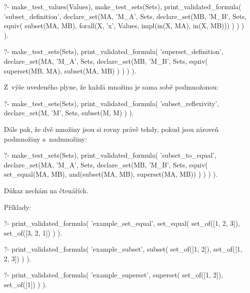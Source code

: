 \begin{prolog}
?- 	make_test_values(Values),
	make_test_sets(Sets),
	print_validated_formula(
		'subset_definition',
		declare_set(MA, 'M_A', Sets,
			declare_set(MB, 'M_B', Sets,
				equiv(
					subset(MA, MB),
					forall(X, 'x', Values, impl(in(X, MA), in(X, MB)))
				)
			)
		)
	).
\end{prolog}

\begin{prolog}
?-	make_test_sets(Sets),
	print_validated_formula(
		'superset_definition',
		declare_set(MA, 'M_A', Sets,
			declare_set(MB, 'M_B', Sets,
				equiv(
					superset(MB, MA),
					subset(MA, MB)
				)
			)
		)
	).
\end{prolog}

Z~výše uvedeného plyne, že každá množina je sama sobě podmnožonou:

\begin{prolog}
?-	make_test_sets(Sets),
	print_validated_formula(
		'subset_reflexivity',
		declare_set(M, 'M', Sets,
			subset(M, M)
		)
	).
\end{prolog}

Dále pak, že dvě množiny jsou si rovny právě tehdy, pokud jsou zároveň podmnožiny a~nadmnožiny:

\begin{prolog}
?-	make_test_sets(Sets),
	print_validated_formula(
		'subset_to_equal',
		declare_set(MA, 'M_A', Sets,
			declare_set(MB, 'M_B', Sets,
				equiv(
					set_equal(MA, MB),
					and(subset(MA, MB), superset(MA, MB))
				)
			)
		)
	).
\end{prolog}

Důkaz nechám na čtenářích.

Příklady:

\begin{prolog}
?-	print_validated_formula(
		'example_set_equal',
		set_equal(
			set_of([1, 2, 3]),
			set_of([3, 2, 1])
		)
	).
\end{prolog}
\begin{prolog}
?-	print_validated_formula(
		'example_subset',
		subset(
			set_of([1, 2]),
			set_of([1, 2, 3])
		)
	).
\end{prolog}
\begin{prolog}
?-	print_validated_formula(
		'example_superset',
		superset(
			set_of([1, 2]),
			set_of([1])
		)
	).
\end{prolog}

